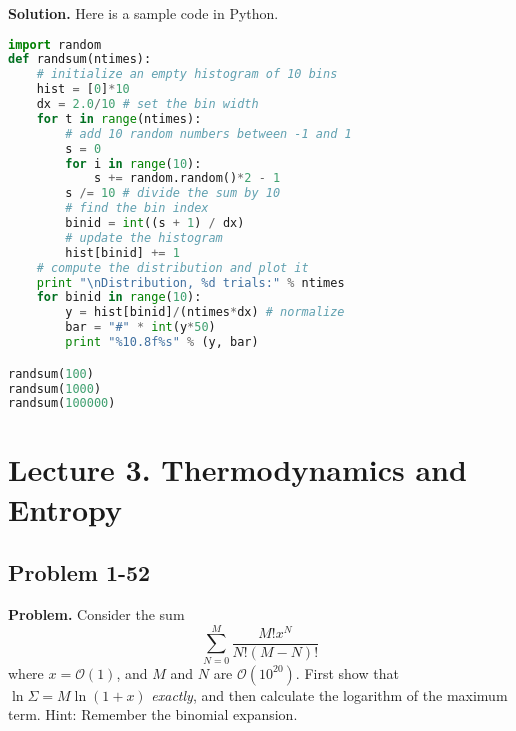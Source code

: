 \documentclass[twocolumn, 10pt]{article}
\numberwithin{equation}{section}
\newenvironment{problem}
{\par\medskip\sffamily \color{problue}
  \textbf{Problem. }\ignorespaces}
{\medskip}
\newenvironment{solution}
{\par\medskip
  \textbf{Solution. }\ignorespaces}
{\medskip}
\begin{document}
\begin{solution}
Here is a sample code in Python.
\begin{lstlisting}[language=Python]
import random
def randsum(ntimes):
    # initialize an empty histogram of 10 bins
    hist = [0]*10
    dx = 2.0/10 # set the bin width
    for t in range(ntimes):
        # add 10 random numbers between -1 and 1
        s = 0
        for i in range(10):
            s += random.random()*2 - 1
        s /= 10 # divide the sum by 10
        # find the bin index
        binid = int((s + 1) / dx)
        # update the histogram
        hist[binid] += 1
    # compute the distribution and plot it
    print "\nDistribution, %d trials:" % ntimes
    for binid in range(10):
        y = hist[binid]/(ntimes*dx) # normalize
        bar = "#" * int(y*50)
        print "%10.8f%s" % (y, bar)

randsum(100)
randsum(1000)
randsum(100000)
\end{lstlisting}
\end{solution}




\section{Lecture 3. Thermodynamics and Entropy}

\subsection{Problem 1-52}

\begin{problem}
  Consider the sum
  $$
  \sum_{N=0}^M \frac{ M! x^N } { N! (M-N)! }
  $$
  where $x = \mathcal O(1)$,
  and $M$ and $N$ are $\mathcal O(10^{20})$.
  First show that
  $\ln\Sigma = M \ln(1+x)$
  \emph{exactly}, and then calculate
  the logarithm of the maximum term.
  Hint: Remember the binomial expansion.
\end{problem}
\end{document}
